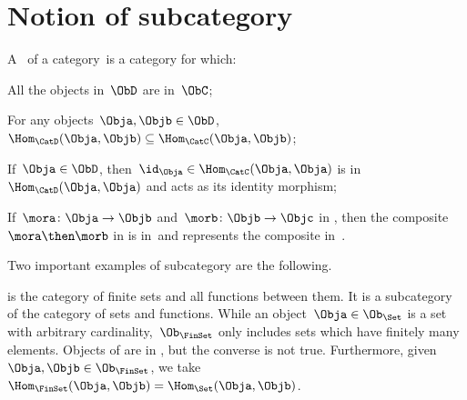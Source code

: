 \label{sec:specialization}



\section{Notion of subcategory}
\begin{ctdefinition}[Subcategory]
    \label{def:subcategory}
    A \emph{}~\CatD of a category~\CatC is a category for which:
    \begin{compactenum}
        \item All the objects in~$\ObD$ are in~$\ObC$;
        \item For any objects~$\Obja,\Objb\in \ObD$,~$\Hom_\CatD(\Obja,\Objb)\subseteq \Hom_\CatC(\Obja,\Objb)$;
        \item If~$\Obja\in \ObD$, then~$\id_\Obja \in \Hom_\CatC(\Obja,\Obja)$ is in~$\Hom_\CatD(\Obja,\Obja)$ and acts as its identity morphism;
        \item If~$\mora \colon \Obja \to \Objb$ and~$\morb\colon \Objb\to \Objc$ in \CatD, then the composite~$\mora \then \morb$ in \CatC is in~\CatD and represents the composite in~\CatD.
    \end{compactenum}
\end{ctdefinition}

Two important examples of subcategory are the following.

\begin{example}
    \iindex{\FinSet} is the category of finite sets and all functions between them. It is a subcategory of the category \Set of sets and functions. While an object~$\Obja \in \Ob_\Set$ is a set with arbitrary cardinality,~$\Ob_{\FinSet}$ only includes sets which have finitely many elements. Objects of \FinSet are in \Set, but the converse is not true. Furthermore, given~$\Obja,\Objb\in \Ob_\FinSet$, we take~$\Hom_{\FinSet}(\Obja,\Objb)=\Hom_{\Set}(\Obja,\Objb)$.
\end{example}


